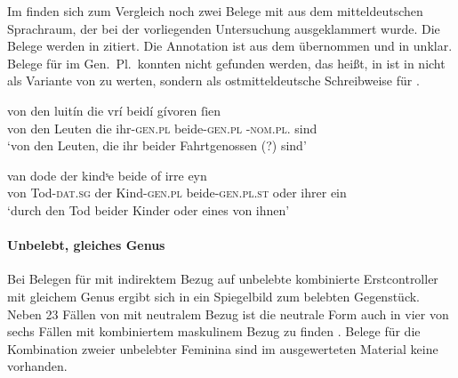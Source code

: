 Im \REM{} finden sich zum Vergleich noch zwei Belege mit  aus dem
mitteldeutschen Sprachraum, der bei der vorliegenden
Untersuchung ausgeklammert wurde. Die Belege werden in 
zitiert. Die Annotation ist aus dem \REM{} übernommen und in
 unklar. Belege für  im Gen.\ Pl.\ konnten
nicht gefunden werden, das heißt,  in  ist in
 nicht als Variante von  zu werten, sondern als
ostmitteldeutsche Schreibweise für 
\autocites[52--53]{paul2007}[305]{ksw2}.

\begin{exe}
\ex \label{ex:remgenbeide}
\begin{xlist}
	\ex \label{ex:remgenbeide_1}
		\gll von den luitín die vrí beidí gívoren ſien \\
			von den Leuten die ihr-\textsc{gen.pl} beide-\textsc{gen.pl}
			-\textsc{nom.pl.\MascA} sind
			\\
		\trans `von den Leuten, die ihr beider Fahrtgenossen (?) sind'
			\parencites(; Nordhausen, Stadtarchiv,
				Ms. II, Na 6%
				)[M320: 17v,21--22]{rem}

	\ex \label{ex:remgenbeide_2}
		\gll van dode der kindˢe beide of irre eyn \\
			von Tod-\textsc{dat.sg} der Kind-\textsc{gen.pl} beide-\textsc{gen.pl.st} oder
			ihrer ein \\
		\trans `durch den Tod beider Kinder oder eines von ihnen'
			\parencites(Köln, Historisches Archiv der Stadt, Best.~210 \mkbibparens{Domstift}, U~3/759)[M350: 5,11]{rem}
\end{xlist}
\end{exe}

\paragraph{Unbelebt, gleiches Genus}

Bei Belegen für  mit indirektem Bezug auf unbelebte kombinierte
Erstcontroller mit gleichem Genus ergibt sich in  ein
Spiegelbild zum belebten Gegenstück. Neben 23 Fällen von  mit
neutralem Bezug ist die neutrale Form auch in vier von sechs Fällen mit
kombiniertem maskulinem Bezug zu finden .
Belege für die Kombination zweier unbelebter Feminina sind im ausgewerteten
Material keine vorhanden.

